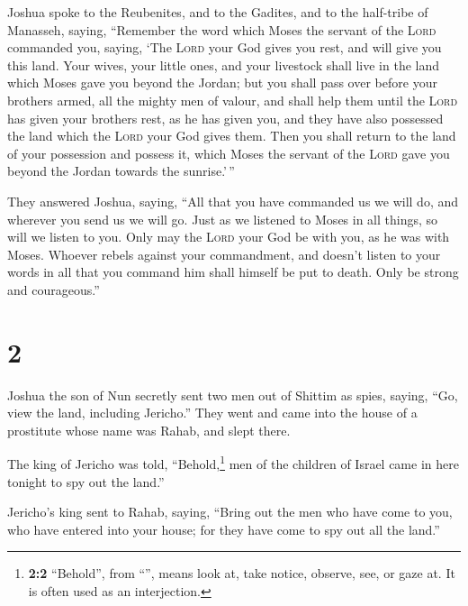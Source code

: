  Joshua spoke to the Reubenites, and to the Gadites, and
to the half-tribe of Manasseh, saying,  ``Remember the
word which Moses the servant of the \textsc{Lord} commanded you, saying,
`The \textsc{Lord} your God gives you rest, and will give you this land.
 Your wives, your little ones, and your livestock shall
live in the land which Moses gave you beyond the Jordan; but you shall
pass over before your brothers armed, all the mighty men of valour, and
shall help them  until the \textsc{Lord} has given your
brothers rest, as he has given you, and they have also possessed the
land which the \textsc{Lord} your God gives them. Then you shall return
to the land of your possession and possess it, which Moses the servant
of the \textsc{Lord} gave you beyond the Jordan towards the
sunrise.'\,''

 They answered Joshua, saying, ``All that you have
commanded us we will do, and wherever you send us we will go.
 Just as we listened to Moses in all things, so will we
listen to you. Only may the \textsc{Lord} your God be with you, as he
was with Moses.  Whoever rebels against your commandment,
and doesn't listen to your words in all that you command him shall
himself be put to death. Only be strong and courageous.''

\hypertarget{section-1}{%
\section{2}\label{section-1}}

 Joshua the son of Nun secretly sent two men out of
Shittim as spies, saying, ``Go, view the land, including Jericho.'' They
went and came into the house of a prostitute whose name was Rahab, and
slept there.

 The king of Jericho was told, ``Behold,\footnote{\textbf{2:2}
  ``Behold'', from ``'', means look at, take notice,
  observe, see, or gaze at. It is often used as an interjection.} men of
the children of Israel came in here tonight to spy out the land.''

 Jericho's king sent to Rahab, saying, ``Bring out the men
who have come to you, who have entered into your house; for they have
come to spy out all the land.''

